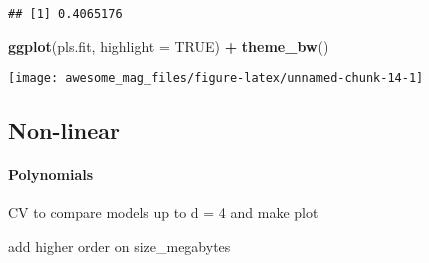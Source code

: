 \documentclass[]{article}
\newenvironment{Shaded}{\begin{snugshade}}{\end{snugshade}}
\newcommand{\KeywordTok}[1]{\textcolor[rgb]{0.13,0.29,0.53}{\textbf{#1}}}
\newcommand{\DataTypeTok}[1]{\textcolor[rgb]{0.13,0.29,0.53}{#1}}
\newcommand{\StringTok}[1]{\textcolor[rgb]{0.31,0.60,0.02}{#1}}
\newcommand{\OtherTok}[1]{\textcolor[rgb]{0.56,0.35,0.01}{#1}}
\newcommand{\OperatorTok}[1]{\textcolor[rgb]{0.81,0.36,0.00}{\textbf{#1}}}
\newcommand{\NormalTok}[1]{#1}
\let\oldparagraph\paragraph
\renewcommand{\paragraph}[1]{\oldparagraph{#1}\mbox{}}
\begin{document}
\begin{verbatim}
## [1] 0.4065176
\end{verbatim}

\begin{Shaded}
\begin{Highlighting}[]
\KeywordTok{ggplot}\NormalTok{(pls.fit, }\DataTypeTok{highlight =} \OtherTok{TRUE}\NormalTok{) }\OperatorTok{+}\StringTok{ }\KeywordTok{theme_bw}\NormalTok{()}
\end{Highlighting}
\end{Shaded}

\texttt{[image: awesome\_mag\_files/figure-latex/unnamed-chunk-14-1]}

\subsection{Non-linear}\label{non-linear}

\paragraph{Polynomials}\label{polynomials}

CV to compare models up to d = 4 and make plot

add higher order on size\_megabytes
\end{document}
